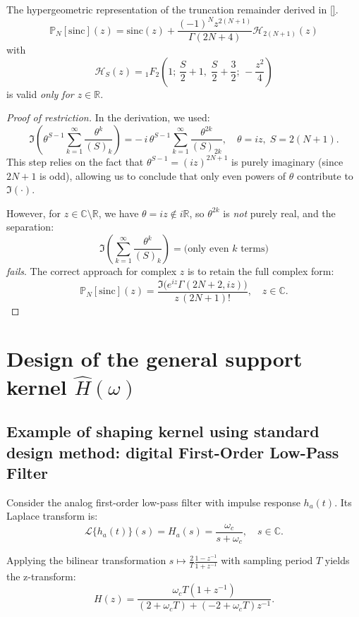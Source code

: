 \begin{lemma}\label{app:hypergeometric}

The hypergeometric representation of the truncation remainder derived in \ref{}.
\[
\mathbb{P}_N[\mathrm{sinc}](z) = \mathrm{sinc}(z) + \frac{(-1)^N z^{2(N+1)}}{\Gamma(2N+4)} \mathcal{H}_{2(N+1)}(z)
\]
with
\[
\mathcal{H}_S(z) = {}_1F_2\!\left(1;\,\frac{S}{2}+1,\;\frac{S}{2}+\frac{3}{2};\,-\frac{z^2}{4}\right)
\]
is valid \emph{only for $z \in \mathbb{R}$}.

\begin{proof}[Proof of restriction] In the derivation, we used:
\[
\Im\!\left(\theta^{S-1} \sum_{k=1}^{\infty} \frac{\theta^{k}}{(S)_k}\right) = -\,i\,\theta^{S-1}\sum_{k=1}^{\infty} \frac{\theta^{2k}}{(S)_{2k}}, \quad \theta = iz, \; S = 2(N+1).
\]
This step relies on the fact that $\theta^{S-1} = (iz)^{2N+1}$ is purely imaginary (since $2N+1$ is odd), allowing us to conclude that only even powers of $\theta$ contribute to $\Im(\cdot)$.

However, for $z \in \mathbb{C} \setminus \mathbb{R}$, we have $\theta = iz \notin i\mathbb{R}$, so $\theta^{2k}$ is \emph{not} purely real, and the separation:
\[
\Im\!\left(\sum_{k=1}^{\infty} \frac{\theta^{k}}{(S)_k}\right) = \text{(only even $k$ terms)}
\]
\emph{fails}. The correct approach for complex $z$ is to retain the full complex form:
\[
\mathbb{P}_N[\mathrm{sinc}](z) = \frac{\Im\!\big(e^{iz}\Gamma(2N+2,iz)\big)}{z\,(2N+1)!}, \quad z \in \mathbb{C}.
\]
\end{proof}
\end{lemma}

\section{Design of the general support kernel $\hat{H}(\omega)$}\label{app:support-kernel}

\subsection{Example of shaping kernel using standard design method: digital First-Order Low-Pass Filter}\label{app:first-order-lpf}

Consider the analog first-order low-pass filter with impulse response $h_a(t)$. Its Laplace transform is:
\[
\mathcal{L}\{h_a(t)\}(s) = H_a(s) = \frac{\omega_c}{s + \omega_c}, \quad s \in \mathbb{C}.
\]

Applying the bilinear transformation $s \mapsto \frac{2}{T}\frac{1-z^{-1}}{1+z^{-1}}$ with sampling period $T$ yields the z-transform:
\[
H(z) = \frac{\omega_c T(1+z^{-1})}{(2 + \omega_c T) + (-2 + \omega_c T)z^{-1}}.
\]

